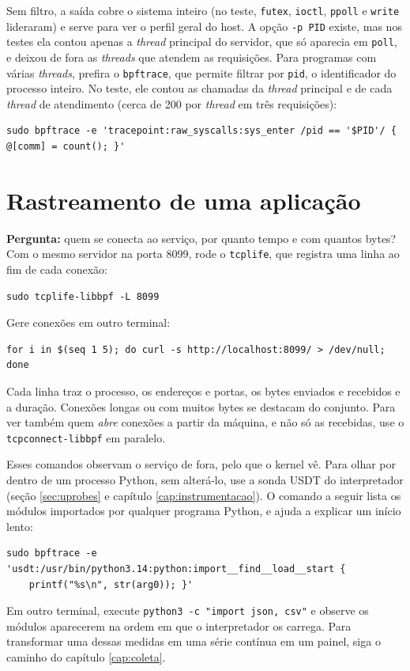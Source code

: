 Sem filtro, a saída cobre o sistema inteiro (no teste, \texttt{futex}, \texttt{ioctl}, \texttt{ppoll} e \texttt{write} lideraram) e serve para ver o perfil geral do host. A opção \texttt{-p PID} existe, mas nos testes ela contou apenas a \textit{thread} principal do servidor, que só aparecia em \texttt{poll}, e deixou de fora as \textit{threads} que atendem as requisições. Para programas com várias \textit{threads}, prefira o \texttt{bpftrace}, que permite filtrar por \texttt{pid}, o identificador do processo inteiro. No teste, ele contou as chamadas da \textit{thread} principal e de cada \textit{thread} de atendimento (cerca de 200 por \textit{thread} em três requisições):

\begin{lstlisting}
sudo bpftrace -e 'tracepoint:raw_syscalls:sys_enter /pid == '$PID'/ { @[comm] = count(); }'
\end{lstlisting}

\section{Rastreamento de uma aplicação}

\textbf{Pergunta:} quem se conecta ao serviço, por quanto tempo e com quantos bytes? Com o mesmo servidor na porta 8099, rode o \texttt{tcplife}, que registra uma linha ao fim de cada conexão:

\begin{lstlisting}
sudo tcplife-libbpf -L 8099
\end{lstlisting}

Gere conexões em outro terminal:

\begin{lstlisting}
for i in $(seq 1 5); do curl -s http://localhost:8099/ > /dev/null; done
\end{lstlisting}

Cada linha traz o processo, os endereços e portas, os bytes enviados e recebidos e a duração. Conexões longas ou com muitos bytes se destacam do conjunto. Para ver também quem \textit{abre} conexões a partir da máquina, e não só as recebidas, use o \texttt{tcpconnect-libbpf} em paralelo.

Esses comandos observam o serviço de fora, pelo que o kernel vê. Para olhar por dentro de um processo Python, sem alterá-lo, use a sonda USDT do interpretador (seção \ref{sec:uprobes} e capítulo \ref{cap:instrumentacao}). O comando a seguir lista os módulos importados por qualquer programa Python, e ajuda a explicar um início lento:

\begin{lstlisting}
sudo bpftrace -e 'usdt:/usr/bin/python3.14:python:import__find__load__start {
    printf("%s\n", str(arg0)); }'
\end{lstlisting}

Em outro terminal, execute \texttt{python3 -c "import json, csv"} e observe os módulos aparecerem na ordem em que o interpretador os carrega. Para transformar uma dessas medidas em uma série contínua em um painel, siga o caminho do capítulo \ref{cap:coleta}.
